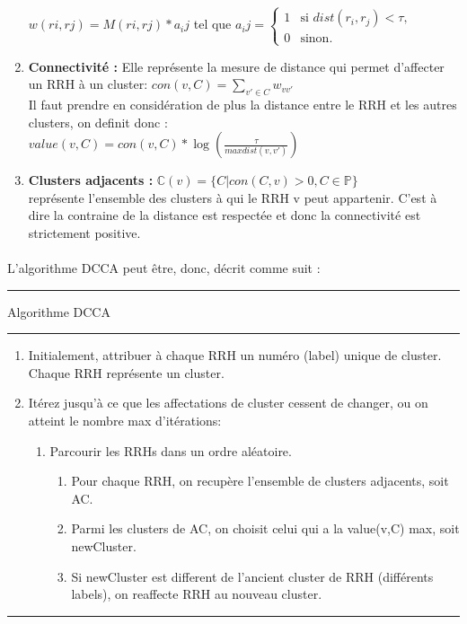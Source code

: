 \documentclass{report}
\begin{document}
\begin{enumerate}
  $w(ri,rj)= M({ri,rj})*a_ij$ tel que $a_ij = \begin{cases}
    1 & \text{si $dist(r_i,r_j) < \tau$,} \\
    0 & \text{sinon.}
    \end{cases}$ 
  \item \textbf{Connectivité :} Elle représente la mesure de distance qui permet d'affecter un RRH à un cluster:      $con(v,C)=\sum_{v'\in C}w_{vv'}$ \\
  Il faut prendre en considération de plus la distance entre le RRH et les autres clusters, on definit donc : \\
  $value(v,C)=con(v,C)*\log{\left(\frac{\tau}{max{dist(v,v')}}\right)} $ 
  \item \textbf{Clusters adjacents :} $\mathbb{C}(v)= \{C| con(C,v) >0, C \in \mathbb{P}\} $ \\
  représente l'ensemble des clusters à qui le RRH v peut appartenir. C'est à dire la contraine de la distance est respectée et donc la connectivité est strictement positive.
\end{enumerate}

\paragraph{}
L'algorithme DCCA peut être, donc, décrit comme suit :\\
\rule{\linewidth}{.1pt} 
\Large{Algorithme} DCCA\\
\rule{\linewidth}{.1pt} 
\begin{enumerate}
\item Initialement, attribuer à chaque RRH un numéro (label) unique de cluster.
Chaque RRH représente un cluster.
\item Itérez jusqu'à ce que les affectations de cluster cessent de changer, ou on atteint le nombre max d'itérations: 
\begin{enumerate}
  \item Parcourir les RRHs dans un ordre aléatoire.
  \begin{enumerate}
    \item Pour chaque RRH, on recupère l'ensemble de clusters adjacents, soit AC.
    \item Parmi les clusters de AC, on choisit celui qui a la value(v,C) max, soit newCluster.
    \item Si newCluster est different de l'ancient cluster de RRH (différents labels), 
    on reaffecte RRH au nouveau cluster.
  \end{enumerate}
\end{enumerate}
\end{enumerate}
\rule{\linewidth}{.1pt} 
\end{document}
